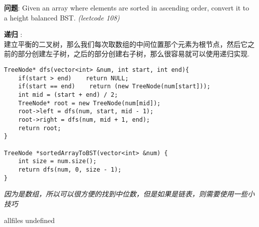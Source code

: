 \documentclass{article}
\begin{document}
\begin{CJK}{UTF8}{gbsn}     %

\else
    
\begin{description}
    \item{\textbf{问题}}: Given an array where elements are sorted in ascending order, convert it to a height balanced BST. \textit{(leetcode 108)}
    \item{\textbf{递归}} : 
    \\建立平衡的二叉树，那么我们每次取数组的中间位置那个元素为根节点，然后它之前的部分创建左子树，之后的部分创建右子树，那么很容易就可以使用递归实现.
    \begin{lstlisting}
TreeNode* dfs(vector<int> &num, int start, int end){
    if(start > end)    return NULL;
    if(start == end)    return (new TreeNode(num[start]));
    int mid = (start + end) / 2;
    TreeNode* root = new TreeNode(num[mid]);
    root->left = dfs(num, start, mid - 1);
    root->right = dfs(num, mid + 1, end);
    return root;
}

TreeNode *sortedArrayToBST(vector<int> &num) {    
    int size = num.size();
    return dfs(num, 0, size - 1);
}
    \end{lstlisting}
    \textit{因为是数组，所以可以很方便的找到中位数，但是如果是链表，则需要使用一些小技巧}
\end{description}

\fi

\ifx allfiles undefined
\end{CJK}
\end{document}
